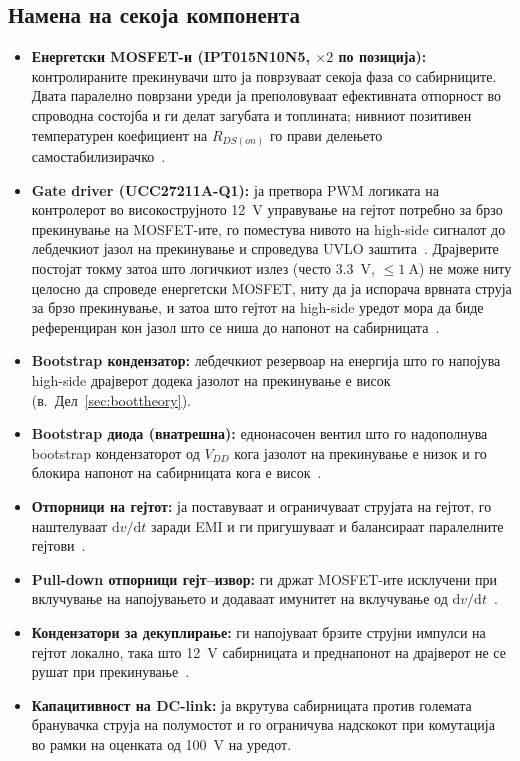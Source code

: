 \documentclass[journal,onecolumn,11pt]{IEEEtran}
\begin{document}
\subsection{Намена на секоја компонента}
\begin{itemize}[leftmargin=1.3em]
  \item \textbf{Енергетски MOSFET-и (IPT015N10N5, $\times 2$ по позиција):}
        контролираните прекинувачи што ја поврзуваат секоја фаза со сабирниците.
        Двата паралелно поврзани уреди ја преполовуваат ефективната отпорност во
        спроводна состојба и ги делат загубата и топлината; нивниот позитивен
        температурен коефициент на $R_{DS(on)}$ го прави делењето
        самостабилизирачко~\cite{balogh}.
  \item \textbf{Gate driver (UCC27211A-Q1):} ја претвора PWM логиката на
        контролерот во високострујното \SI{12}{\volt} управување на гејтот потребно
        за брзо прекинување на MOSFET-ите, го поместува нивото на high-side
        сигналот до лебдечкиот јазол на прекинување и спроведува UVLO
        заштита~\cite{ucc27211}. Драјверите постојат токму затоа што логичкиот излез
        (често \SI{3.3}{\volt}, $\le\SI{1}{\ampere}$) не може ниту целосно да
        спроведе енергетски MOSFET, ниту да ја испорача врвната струја за брзо
        прекинување, и затоа што гејтот на high-side уредот мора да биде референциран
        кон јазол што се ниша до напонот на сабирницата~\cite{ucc27211,balogh}.
  \item \textbf{Bootstrap кондензатор:} лебдечкиот резервоар на енергија што го
        напојува high-side драјверот додека јазолот на прекинување е висок
        (в.\ Дел~\ref{sec:boottheory}).
  \item \textbf{Bootstrap диода (внатрешна):} еднонасочен вентил што го надополнува
        bootstrap кондензаторот од $V_{DD}$ кога јазолот на прекинување е низок и го
        блокира напонот на сабирницата кога е висок~\cite{ucc27211,infineon_monolithic}.
  \item \textbf{Отпорници на гејтот:} ја поставуваат и ограничуваат струјата на
        гејтот, го наштелуваат $\mathrm{d}v/\mathrm{d}t$ заради EMI и ги пригушуваат
        и балансираат паралелните гејтови~\cite{balogh}.
  \item \textbf{Pull-down отпорници гејт--извор:} ги држат MOSFET-ите исклучени при
        вклучување на напојувањето и додаваат имунитет на вклучување од
        $\mathrm{d}v/\mathrm{d}t$~\cite{balogh}.
  \item \textbf{Кондензатори за декуплирање:} ги напојуваат брзите струјни импулси
        на гејтот локално, така што \SI{12}{\volt} сабирницата и преднапонот на
        драјверот не се рушат при прекинување~\cite{ucc27211}.
  \item \textbf{Капацитивност на DC-link:} ја вкрутува сабирницата против големата
        бранувачка струја на полумостот и го ограничува надскокот при комутација во
        рамки на оценката од \SI{100}{\volt} на уредот.
\end{itemize}
\end{document}

